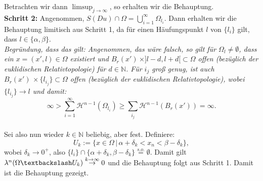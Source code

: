     Betrachten wir dann \(\limsup_{j \to \infty}\), so erhalten wir die Behauptung.\\
\textbf{Schritt 2:} Angenommen, \(S(Du) \cap \Omega = \bigcup_{i=1}^{\infty} \Omega_{l_i}\). Dann erhalten wir die Behauptung limitisch aus Schritt 1, da für einen Häufungspunkt \(l\) von \(\{l_i\}\) gilt, dass \(l \in \{\alpha,\beta\}\).\\[0.2cm]
    \textit{Begründung, dass das gilt: Angenommen, das wäre falsch, so gilt für \(\Omega_l \neq \emptyset\), dass ein \(x = (x',l) \in \Omega\) existiert und \(B_{r}(x') \, \times ]l-d,l+d[ \subset \Omega\) offen (bezüglich der euklidischen Relativtopologie) für \(d \in \mathbb{N}\). Für \(i_j\) groß genug, ist auch \(B_{r}(x') \, \times \{l_{i_j}\} \subset \Omega\) offen (bezüglich der euklidischen Relativtopologie), wobei \(\{l_{i_j}\} \to l\) und damit:
    \begin{equation}
        \infty > \sum_{i=1}^{\infty} \mathcal{H}^{n-1} (\Omega_{l_i}) \geq \sum_{i_j} \mathcal{H}^{n-1}(B_{r}(x')) = \infty.
    \end{equation}
    }\\[0.2cm]
    Sei also nun wieder \(k \in \mathbb{N}\) beliebig, aber fest. Definiere:
    \begin{equation}
        U_k := \{x \in \Omega \, | \, \alpha + \delta_k < x_n < \beta - \delta_k\},
    \end{equation}
    wobei \(\delta_k \to 0^+\), also \(\{l_i\} \cap \{\alpha + \delta_k, \beta - \delta_k\} \stackrel{s.o.}{=} \emptyset\). Damit gilt \(\lambda^n(\Omega \textbackslash U_k) \stackrel{k \to \infty}{\to} 0\) und die Behauptung folgt aus Schritt 1. 
Damit ist die Behauptung gezeigt. \QEDB
